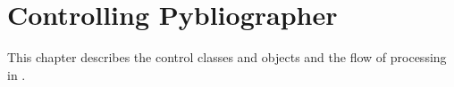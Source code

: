 
\chapter{Controlling Pybliographer}
\label{cha:pcontrol}


This chapter describes the control classes and objects and the flow of
processing in \Pyb.



